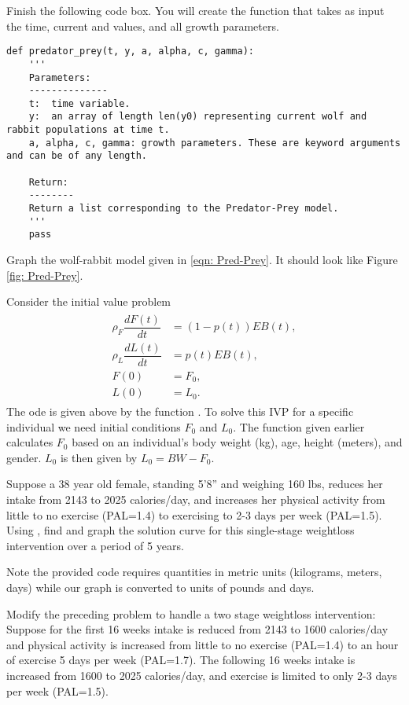 
Finish the following code box. You will create the function that takes as input the time, current  and  values, and all growth parameters.
\begin{lstlisting}
def predator_prey(t, y, a, alpha, c, gamma):
	'''
	Parameters:
	--------------
	t:	time variable.
	y:	an array of length len(y0) representing current wolf and rabbit populations at time t.
	a, alpha, c, gamma:	growth parameters. These are keyword arguments and can be of any length.
	
	Return:
	--------
	Return a list corresponding to the Predator-Prey model.
	'''
	pass
\end{lstlisting}

Graph the wolf-rabbit model given in \eqref{eqn: Pred-Prey}.
It should look like Figure \ref{fig: Pred-Prey}.

Consider the initial value problem
\begin{align}
	\begin{split}
\rho_F \dfrac{dF(t)}{dt} &= (1-p(t)) EB(t),\\
\rho_L \dfrac{dL(t)}{dt} &= p(t) EB(t),\\
F(0) &= F_0, \\
L(0) &= L_0.
	\end{split}\label{eqn:weight_prob1}
\end{align}
The ode is given above by the function .
To solve this IVP for a specific individual we need initial conditions $F_0$ and $L_0.$
The function  given earlier calculates $F_0$ based on an individual's body weight (kg), age, height (meters), and gender.
$L_0$ is then given by $L_0 = BW - F_0$.

Suppose a 38 year old female, standing 5'8'' and weighing 160 lbs, reduces her intake from 2143 to 2025 calories/day, and increases her physical activity from little to no exercise (PAL=1.4) to exercising to 2-3 days per week (PAL=1.5).
Using , find and graph the solution curve for this single-stage weightloss intervention over a period of 5 years.

Note the provided code requires quantities in metric units (kilograms, meters, days) while our graph is converted to units of pounds and days.

Modify the preceding problem to handle a two stage weightloss intervention:
Suppose for the first 16 weeks intake is reduced from 2143 to 1600 calories/day and physical activity is increased from little to no exercise (PAL=1.4) to an hour of exercise 5 days per week (PAL=1.7).
The following 16 weeks intake is increased from 1600 to 2025 calories/day, and exercise is limited to only 2-3 days per week (PAL=1.5).

